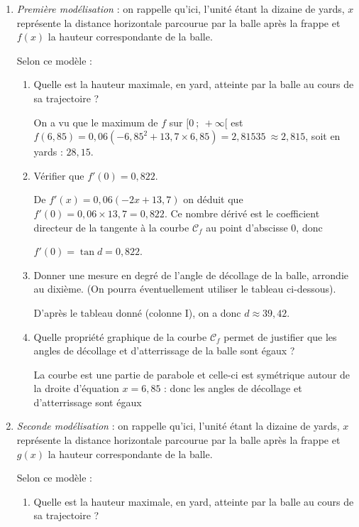\documentclass[10pt]{article}
\providecommand{\np}[2][]{{#2~#1}}
\begin{document}
\begin{enumerate}
\item \emph{Première modélisation} : on rappelle qu'ici, l'unité étant la dizaine de yards, $x$ représente la distance horizontale parcourue par la balle après la frappe et $f(x)$ la hauteur correspondante de la balle.

Selon ce modèle :
	\begin{enumerate}
		\item Quelle est la hauteur maximale, en yard, atteinte par la balle au cours de sa trajectoire ?
		
On a vu que le maximum de $f$ sur $[0~;~+ \infty[$ est $f(6,85) = 0,06\left(- 6,85^2 + 13,7 \times 6,85\right) = \np{2,81535} \approx 2,815$, soit en yards : $28,15$.

		\item Vérifier que $f'(0) = 0,822$.
		
De $f'(x) = 0,06(- 2x + 13,7)$ on déduit que $f'(0) = 0,06 \times 13,7 = 0,822$. Ce nombre dérivé est le coefficient directeur de la tangente à la courbe $\mathcal{C}_f$ au point d'abscisse $0$, donc 

$f'(0) = \tan d = 0,822$.

		\item Donner une mesure en degré de l'angle de décollage de la balle, arrondie au dixième. (On pourra éventuellement utiliser le tableau ci-dessous).
		
D'après le tableau donné (colonne I), on a donc $d \approx 39,42$.
		\item Quelle propriété graphique de la courbe $\mathcal{C}_f$ permet de justifier que les angles de décollage et d'atterrissage de la balle sont égaux ?
		
	La courbe est une partie de parabole et celle-ci est symétrique autour de la droite d'équation $x = 6,85$ : donc les angles de décollage et d'atterrissage sont égaux
	\end{enumerate}
\item \emph{Seconde modélisation } : on rappelle qu'ici, l'unité étant la dizaine de yards, $x$ représente la distance horizontale parcourue par la balle après la frappe et $g(x)$ la hauteur correspondante de la balle.

Selon ce modèle :

	\begin{enumerate}
		\item Quelle est la hauteur maximale, en yard, atteinte par la balle au cours de sa trajectoire ?


\end{enumerate}
\end{enumerate}
\end{document}
